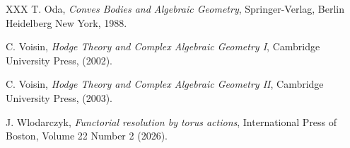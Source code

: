 \documentclass[12pt, english]{article}
\begin{document}
\begin{thebibliography}{XXX}
		 T. Oda, \emph{{Conves Bodies and Algebraic Geometry}}, Springer-Verlag, Berlin Heidelberg New York, 1988.
	
	
	
	
	
	
	
	 C. Voisin, \emph{{Hodge Theory and Complex Algebraic Geometry I}}, Cambridge University Press, (2002).
	
		 C. Voisin, \emph{{Hodge Theory and Complex Algebraic Geometry II}}, Cambridge University Press, (2003).
	
	 J. Wlodarczyk, \emph{{Functorial resolution by torus actions}}, International Press of Boston, Volume 22 Number 2 (2026).
	
\end{thebibliography}	
\end{document}
